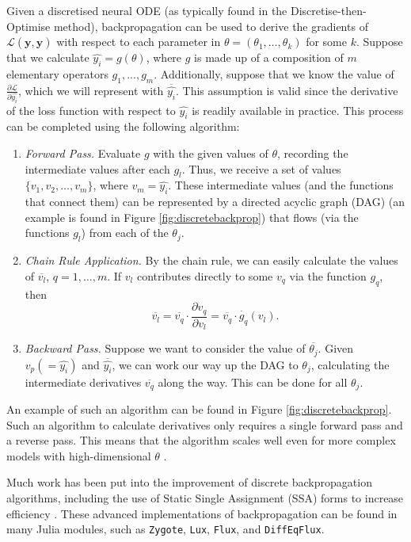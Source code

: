 \documentclass[a4paper,11pt,titlepage]{article}
\theoremstyle{definition}
\theoremstyle{plain}
\theoremstyle{remark}
\begin{document}
Given a discretised neural ODE (as typically found in the Discretise-then-Optimise method), backpropagation can be used to derive the gradients of $\mathcal{L}(\mathbf{y}, \mathbf{\hat{y}})$ with respect to each parameter in $\theta = (\theta_1, \dots, \theta_k)$ for some $k$. Suppose that we calculate $\hat{y_i} = g(\theta)$, where $g$ is made up of a composition of $m$ elementary operators $g_1, ..., g_m$. Additionally, suppose that we know the value of $\frac{\partial \mathcal{L}}{\partial \hat{y_i}}$, which we will represent with $\overline{\hat{y_i}}$. This assumption is valid since the derivative of the loss function with respect to $\hat{y_i}$ is readily available in practice. This process can be completed using the following algorithm:
\begin{enumerate}
    \item \textit{Forward Pass.} Evaluate $g$ with the given values of $\theta$, recording the intermediate values after each $g_l$. Thus, we receive a set of values $\{v_1, v_2, \dots, v_m \}$, where $v_m = \hat{y_i}$. These intermediate values (and the functions that connect them) can be represented by a directed acyclic graph (DAG) (an example is found in Figure \ref{fig:discretebackprop}) that flows (via the functions $g_l$) from each of the $\theta_j$.
    \item \textit{Chain Rule Application.} By the chain rule, we can easily calculate the values of $\overline{v_l}$, $q = 1, \dots, m$. If $v_l$ contributes directly to some $v_{q}$ via the function $g_q$, then
    $$
    \overline{v_l} = \overline{v_{q}} \cdot \frac{\partial v_{q}}{\partial v_l} = \overline{v_{q}} \cdot \dot{g_q}(v_l).
    $$
    \item \textit{Backward Pass.} Suppose we want to consider the value of $\overline{\theta_j}$. Given $v_p ( = \hat{y_i})$ and $\overline{\hat{y_i}}$, we can work our way up the DAG to $\theta_j$, calculating the intermediate derivatives $\overline{v_q}$ along the way. This can be done for all $\theta_j$.
\end{enumerate}

An example of such an algorithm can be found in Figure \ref{fig:discretebackprop}. Such an algorithm to calculate derivatives only requires a single forward pass and a reverse pass. This means that the algorithm scales well even for more complex models with high-dimensional $\theta$ \cite{ketkar2017}. 

Much work has been put into the improvement of discrete backpropagation algorithms, including the use of Static Single Assignment (SSA) forms to increase efficiency \cite{innes2019}. These advanced implementations of backpropagation can be found in many Julia modules, such as \texttt{Zygote}, \texttt{Lux}, \texttt{Flux}, and \texttt{DiffEqFlux}. %
\end{document}
